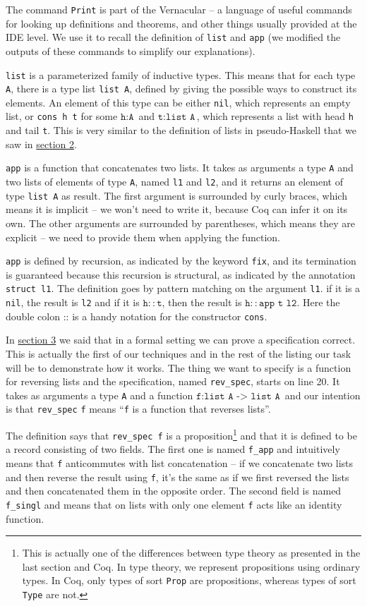 \documentclass[declaration,mgr,english,shortabstract]{iithesis}
\newcommand{\m}[1]{\texttt{#1}}
\begin{document}
The command \m{Print} is part of the Vernacular -- a language of useful commands for looking up definitions and theorems, and other things usually provided at the IDE level. We use it to recall the definition of \m{list} and \m{app} (we modified the outputs of these commands to simplify our explanations).

\m{list} is a parameterized family of inductive types. This means that for each type \m{A}, there is a type list \m{list A}, defined by giving the possible ways to construct its elements. An element of this type can be either \m{nil}, which represents an empty list, or \m{cons h t} for some $\m{h} : \m{A}$ and $\m{t} : \m{list A}$, which represents a list with head \m{h} and tail \m{t}. This is very similar to the definition of lists in pseudo-Haskell that we saw in \hyperref[impfun]{section 2}.

\m{app} is a function that concatenates two lists. It takes as arguments a type \m{A} and two lists of elements of type \m{A}, named \m{l1} and \m{l2}, and it returns an element of type \m{list A} as result. The first argument is surrounded by curly braces, which means it is implicit -- we won't need to write it, because Coq can infer it on its own. The other arguments are surrounded by parentheses, which means they are explicit -- we need to provide them when applying the function.

\m{app} is defined by recursion, as indicated by the keyword \m{fix}, and its termination is guaranteed because this recursion is structural, as indicated by the annotation \m{struct l1}. The definition goes by pattern matching on the argument \m{l1}. if it is a \m{nil}, the result is \m{l2} and if it is $\m{h} :: \m{t}$, then the result is $\m{h} :: \m{app t l2}$. Here the double colon $\m{::}$ is a handy notation for the constructor \m{cons}.

In \hyperref[worlds]{section 3} we said that in a formal setting we can prove a specification correct. This is actually the first of our techniques and in the rest of the listing our task will be to demonstrate how it works. The thing we want to specify is a function for reversing lists and the specification, named \m{rev\_spec}, starts on line 20. It takes as arguments a type \m{A} and a function $\m{f} : \m{list A -> list A}$ and our intention is that \m{rev\_spec} \m{f} means ``\m{f} is a function that reverses lists''.

The definition says that \m{rev\_spec f} is a proposition\footnote{This is actually one of the differences between type theory as presented in the last section and Coq. In type theory, we represent propositions using ordinary types. In Coq, only types of sort \m{Prop} are propositions, whereas types of sort \m{Type} are not.} and that it is defined to be a record consisting of two fields. The first one is named \m{f\_app} and intuitively means that \m{f} anticommutes with list concatenation -- if we concatenate two lists and then reverse the result using \m{f}, it's the same as if we first reversed the lists and then concatenated them in the opposite order. The second field is named \m{f\_singl} and means that on lists with only one element \m{f} acts like an identity function.
\end{document}
